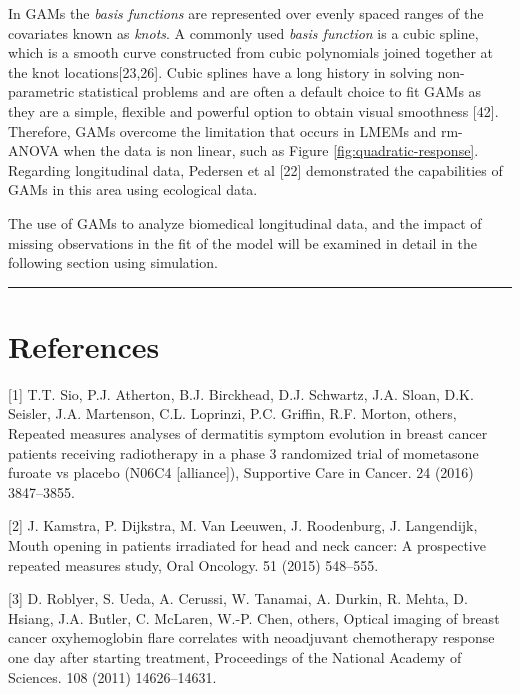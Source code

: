 \documentclass[
]{article}
\begin{document}
In GAMs the \emph{basis functions} are represented over evenly spaced ranges of the covariates known as \emph{knots}. A commonly used \emph{basis function} is a cubic spline, which is a smooth curve constructed from cubic polynomials joined together at the knot locations{[}23,26{]}. Cubic splines have a long history in solving non-parametric statistical problems and are often a default choice to fit GAMs as they are a simple, flexible and powerful option to obtain visual smoothness {[}42{]}. Therefore, GAMs overcome the limitation that occurs in LMEMs and rm-ANOVA when the data is non linear, such as Figure \ref{fig:quadratic-response}. Regarding longitudinal data, Pedersen et al {[}22{]} demonstrated the capabilities of GAMs in this area using ecological data.

The use of GAMs to analyze biomedical longitudinal data, and the impact of missing observations in the fit of the model will be examined in detail in the following section using simulation.

\begin{center}\rule{0.5\linewidth}{0.5pt}\end{center}

\hypertarget{references}{%
\section*{References}\label{references}}

\hypertarget{refs}{}
\leavevmode\hypertarget{ref-sio2016}{}%
{[}1{]} T.T. Sio, P.J. Atherton, B.J. Birckhead, D.J. Schwartz, J.A. Sloan, D.K. Seisler, J.A. Martenson, C.L. Loprinzi, P.C. Griffin, R.F. Morton, others, Repeated measures analyses of dermatitis symptom evolution in breast cancer patients receiving radiotherapy in a phase 3 randomized trial of mometasone furoate vs placebo (N06C4 {[}alliance{]}), Supportive Care in Cancer. 24 (2016) 3847--3855.

\leavevmode\hypertarget{ref-kamstra2015}{}%
{[}2{]} J. Kamstra, P. Dijkstra, M. Van Leeuwen, J. Roodenburg, J. Langendijk, Mouth opening in patients irradiated for head and neck cancer: A prospective repeated measures study, Oral Oncology. 51 (2015) 548--555.

\leavevmode\hypertarget{ref-roblyer2011}{}%
{[}3{]} D. Roblyer, S. Ueda, A. Cerussi, W. Tanamai, A. Durkin, R. Mehta, D. Hsiang, J.A. Butler, C. McLaren, W.-P. Chen, others, Optical imaging of breast cancer oxyhemoglobin flare correlates with neoadjuvant chemotherapy response one day after starting treatment, Proceedings of the National Academy of Sciences. 108 (2011) 14626--14631.
\end{document}

